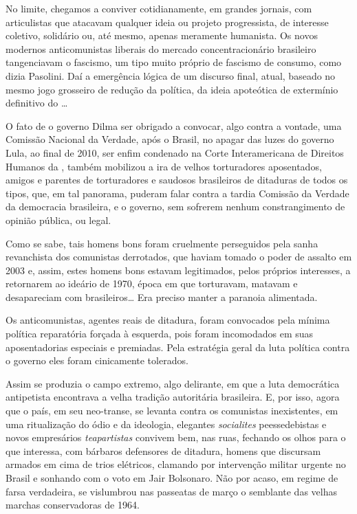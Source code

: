No limite, chegamos a conviver cotidianamente, em grandes jornais, com
articulistas que atacavam qualquer ideia ou projeto progressista, de
interesse coletivo, solidário ou, até mesmo, apenas meramente humanista.
Os novos modernos anticomunistas liberais do mercado concentracionário
brasileiro tangenciavam o fascismo, um tipo muito próprio de fascismo de
consumo, como dizia Pasolini. Daí a emergência lógica de um discurso
final, atual, baseado no mesmo jogo grosseiro de redução da política, da
ideia apoteótica de extermínio definitivo do …

O fato de o governo Dilma ser obrigado a convocar, algo contra a vontade,
uma Comissão Nacional da Verdade, após o Brasil, no apagar das luzes do
governo Lula, ao final de 2010, ser enfim condenado na Corte
Interamericana de Direitos Humanos da , também mobilizou a ira de
velhos torturadores aposentados, amigos e parentes de torturadores e
saudosos brasileiros de ditaduras de todos os tipos, que, em tal
panorama, puderam falar contra a tardia Comissão da Verdade da
democracia brasileira, e o governo, sem sofrerem nenhum constrangimento
de opinião pública, ou legal.

Como se sabe, tais homens bons foram cruelmente perseguidos pela sanha
revanchista dos comunistas derrotados, que haviam tomado o poder de
assalto em 2003 e, assim, estes homens bons estavam legitimados, pelos
próprios interesses, a retornarem ao ideário de 1970, época em que
torturavam, matavam e desapareciam com brasileiros… Era preciso manter
a paranoia alimentada.

Os anticomunistas, agentes reais de ditadura, foram convocados pela
mínima política reparatória forçada à esquerda, pois foram incomodados
em suas aposentadorias especiais e premiadas. Pela estratégia geral da
luta política contra o governo eles foram cinicamente tolerados.

Assim se produzia o campo extremo, algo delirante, em que a luta
democrática antipetista encontrava a velha tradição autoritária
brasileira. E, por isso, agora que o país, em seu neo-transe, se levanta
contra os comunistas inexistentes, em uma ritualização do ódio e da
ideologia, elegantes \textit{socialites} peessedebistas e novos empresários
\emph{teapartistas} convivem bem, nas ruas, fechando os olhos para o que
interessa, com bárbaros defensores de ditadura, homens que discursam
armados em cima de trios elétricos, clamando por intervenção militar
urgente no Brasil e sonhando com o voto em Jair Bolsonaro. Não por
acaso, em regime de farsa verdadeira, se vislumbrou nas passeatas de
março o semblante das velhas marchas conservadoras de 1964.

